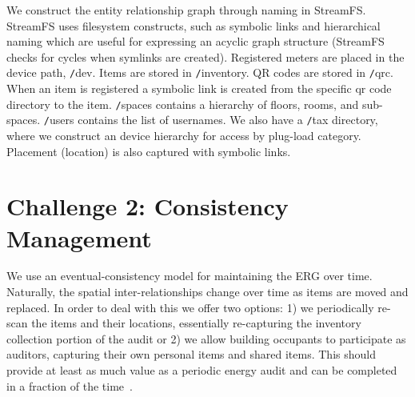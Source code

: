 We construct the entity relationship graph through naming in StreamFS.  StreamFS uses filesystem constructs, such as symbolic
links and hierarchical naming which are useful for expressing an acyclic graph structure (StreamFS checks for cycles when symlinks 
are created).  
Registered meters are placed in the device path, {\texttt /dev}.  Items are stored in {\texttt /inventory}.  QR codes are stored 
in {\texttt /qrc}.  When an item is registered a 
symbolic link is created from the specific qr code directory to the item.  {\texttt /spaces} contains a hierarchy of floors, rooms, 
and sub-spaces.  {\texttt /users} contains the list of usernames.  We also have a {\texttt /tax} directory, where we construct an
device hierarchy for access by plug-load category.  Placement (location) is also captured with symbolic links. 

\section{Challenge 2: Consistency Management}
We use an eventual-consistency model for maintaining the ERG over time.  Naturally, the spatial inter-relationships
change over time as items are moved and replaced.  In order to deal with this we offer two options: 1) we periodically
re-scan the items and their locations, essentially re-capturing the inventory collection portion of the audit or
2) we allow building occupants to participate as auditors, capturing their own personal items and shared items.
This should provide at least as much value as a periodic energy audit and can be completed in a fraction of the 
time~\cite{aceee_mobileaudit}.


